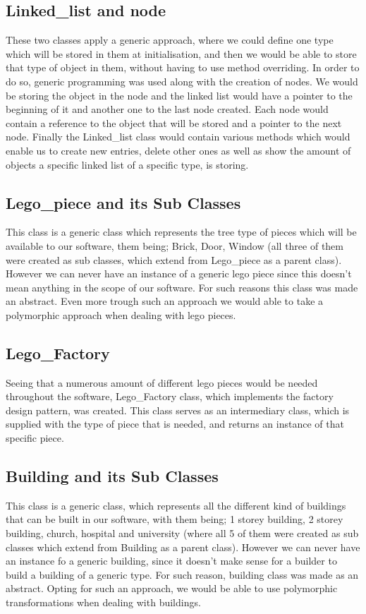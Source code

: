 \documentclass[12pt, A4]{report}
\begin{document}
		\subsection*{Linked\_list and node}
		These two classes apply a generic approach, where we could define one type which will be stored in them at initialisation, and then we would be able to store that type of object in them, without having to use method overriding. In order to do so, generic programming was used along with the creation of nodes. We would be storing the object in the node and the linked list would have a pointer to the beginning of it and another one to the last node created. Each node would contain a reference to the object that will be stored and a pointer to the next node. Finally the Linked\_list class would contain various methods which would enable us to create new entries, delete other ones as well as show the amount of objects a specific linked list of a specific type, is storing.

		\subsection*{Lego\_piece and its Sub Classes}
		This class is a generic class which represents the tree type of pieces which will be available to our software, them being; Brick, Door, Window (all three of them were created as sub classes, which extend from Lego\_piece as a parent class). However we can never have an instance of a generic lego piece since this doesn't mean anything in the scope of our software. For such reasons this class was made an abstract. Even more trough such an approach we would able to take a polymorphic approach when dealing with lego pieces.

		\subsection*{Lego\_Factory}
		Seeing that a numerous amount of different lego pieces would be needed throughout the software, Lego\_Factory class, which implements the factory design pattern, was created. This class serves as an intermediary class, which is supplied with the type of piece that is needed, and returns an instance of that specific piece.

		\subsection*{Building and its Sub Classes}
		This class is a generic class, which represents all the different kind of buildings that can be built in our software, with them being; 1 storey building, 2 storey building, church, hospital and university (where all 5 of them were created as sub classes which extend from Building as a parent class). However we can never have an instance fo a generic building, since it doesn't make sense for a builder to build a building of a generic type. For such reason, building class was made as an abstract. Opting for such an approach, we would be able to use polymorphic transformations when dealing with buildings. 
\end{document}
